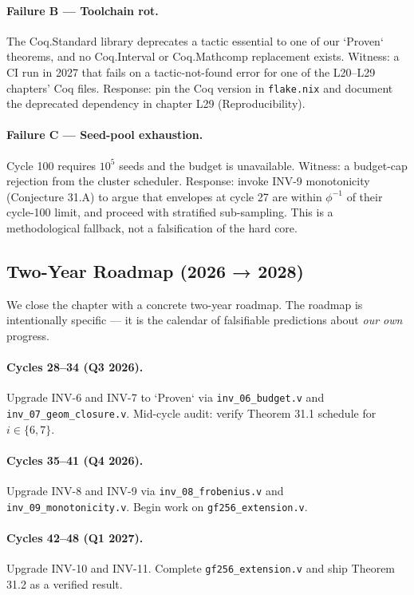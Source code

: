 \paragraph{Failure B — Toolchain rot.} The Coq.Standard library deprecates a tactic essential to one of our `Proven` theorems, and no Coq.Interval or Coq.Mathcomp replacement exists. Witness: a CI run in 2027 that fails on a tactic-not-found error for one of the L20–L29 chapters' Coq files. Response: pin the Coq version in \texttt{flake.nix} and document the deprecated dependency in chapter L29 (Reproducibility).

\paragraph{Failure C — Seed-pool exhaustion.} Cycle 100 requires $10^{5}$ seeds and the budget is unavailable. Witness: a budget-cap rejection from the cluster scheduler. Response: invoke INV-9 monotonicity (Conjecture 31.A) to argue that envelopes at cycle 27 are within $\phi^{-1}$ of their cycle-100 limit, and proceed with stratified sub-sampling. This is a methodological fallback, not a falsification of the hard core.

\subsection{Two-Year Roadmap (2026 → 2028)}
\label{sec:31-roadmap}

We close the chapter with a concrete two-year roadmap. The roadmap is intentionally specific — it is the calendar of falsifiable predictions about \emph{our own} progress.

\paragraph{Cycles 28–34 (Q3 2026).} Upgrade INV-6 and INV-7 to `Proven` via \texttt{inv\_06\_budget.v} and \texttt{inv\_07\_geom\_closure.v}. Mid-cycle audit: verify Theorem 31.1 schedule for $i \in \{6, 7\}$.

\paragraph{Cycles 35–41 (Q4 2026).} Upgrade INV-8 and INV-9 via \texttt{inv\_08\_frobenius.v} and \texttt{inv\_09\_monotonicity.v}. Begin work on \texttt{gf256\_extension.v}.

\paragraph{Cycles 42–48 (Q1 2027).} Upgrade INV-10 and INV-11. Complete \texttt{gf256\_extension.v} and ship Theorem 31.2 as a verified result.

